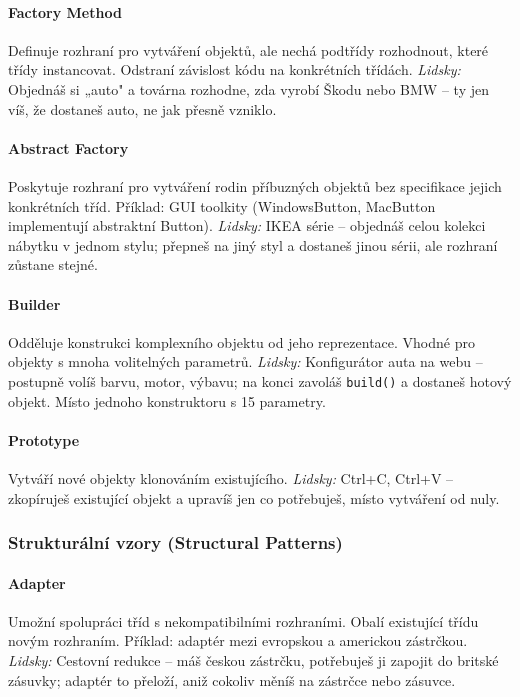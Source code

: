 \paragraph{Factory Method}
Definuje rozhraní pro vytváření objektů, ale nechá podtřídy rozhodnout, které třídy instancovat.
Odstraní závislost kódu na konkrétních třídách.
\textit{Lidsky:} Objednáš si „auto" a továrna rozhodne, zda vyrobí Škodu nebo BMW -- ty jen víš, že dostaneš auto, ne jak přesně vzniklo.

\paragraph{Abstract Factory}
Poskytuje rozhraní pro vytváření rodin příbuzných objektů bez specifikace jejich konkrétních tříd.
Příklad: GUI toolkity (WindowsButton, MacButton implementují abstraktní Button).
\textit{Lidsky:} IKEA série -- objednáš celou kolekci nábytku v jednom stylu; přepneš na jiný styl a dostaneš jinou sérii, ale rozhraní zůstane stejné.

\paragraph{Builder}
Odděluje konstrukci komplexního objektu od jeho reprezentace.
Vhodné pro objekty s mnoha volitelných parametrů.
\textit{Lidsky:} Konfigurátor auta na webu -- postupně volíš barvu, motor, výbavu; na konci zavoláš \texttt{build()} a dostaneš hotový objekt. Místo jednoho konstruktoru s 15 parametry.

\paragraph{Prototype}
Vytváří nové objekty klonováním existujícího.
\textit{Lidsky:} Ctrl+C, Ctrl+V -- zkopíruješ existující objekt a upravíš jen co potřebuješ, místo vytváření od nuly.

\subsubsection{Strukturální vzory (Structural Patterns)}

\paragraph{Adapter}
Umožní spolupráci tříd s nekompatibilními rozhraními. Obalí existující třídu novým rozhraním.
Příklad: adaptér mezi evropskou a americkou zástrčkou.
\textit{Lidsky:} Cestovní redukce -- máš českou zástrčku, potřebuješ ji zapojit do britské zásuvky; adaptér to přeloží, aniž cokoliv měníš na zástrčce nebo zásuvce.


